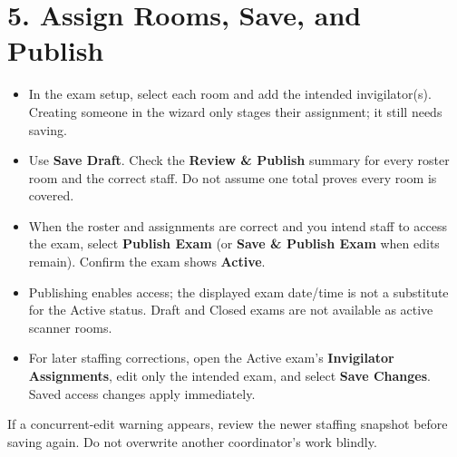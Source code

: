\documentclass[10pt,a4paper]{article}
\begin{document}
\section*{5. Assign Rooms, Save, and Publish}
\begin{itemize}\item[1.] In the exam setup, select each room and add the intended invigilator(s). Creating someone in the wizard only stages their assignment; it still needs saving.\end{itemize}
\begin{itemize}\item[2.] Use \textbf{Save Draft}. Check the \textbf{Review \& Publish} summary for every roster room and the correct staff. Do not assume one total proves every room is covered.\end{itemize}
\begin{itemize}\item[3.] When the roster and assignments are correct and you intend staff to access the exam, select \textbf{Publish Exam} (or \textbf{Save \& Publish Exam} when edits remain). Confirm the exam shows \textbf{Active}.\end{itemize}
\begin{itemize}\item[4.] Publishing enables access; the displayed exam date/time is not a substitute for the Active status. Draft and Closed exams are not available as active scanner rooms.\end{itemize}
\begin{itemize}\item[5.] For later staffing corrections, open the Active exam's \textbf{Invigilator Assignments}, edit only the intended exam, and select \textbf{Save Changes}. Saved access changes apply immediately.\end{itemize}
If a concurrent-edit warning appears, review the newer staffing snapshot before saving again. Do not overwrite another coordinator's work blindly.\par
\end{document}
